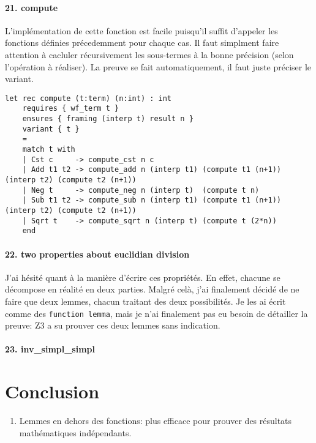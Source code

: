 \documentclass[a4paper]{article}%
\begin{document}
	\paragraph{21. compute} L'implémentation de cette fonction est facile puisqu'il suffit d'appeler les fonctions
	définies précedemment pour chaque cas. Il faut simplment faire attention à cacluler récursivement les sous-termes
	à la bonne précision (selon l'opération à réaliser). La preuve se fait automatiquement, il faut juste préciser le variant.
	\begin{verbatim}
let rec compute (t:term) (n:int) : int
	requires { wf_term t }
	ensures { framing (interp t) result n }
	variant { t }
	=
	match t with
	| Cst c     -> compute_cst n c
	| Add t1 t2 -> compute_add n (interp t1) (compute t1 (n+1)) (interp t2) (compute t2 (n+1))
	| Neg t     -> compute_neg n (interp t)  (compute t n)
	| Sub t1 t2 -> compute_sub n (interp t1) (compute t1 (n+1)) (interp t2) (compute t2 (n+1))
	| Sqrt t    -> compute_sqrt n (interp t) (compute t (2*n))
	end
	\end{verbatim}

	\paragraph{22. two properties about euclidian division } J'ai hésité quant à la manière d'écrire ces propriétés.
	En effet, chacune se décompose en réalité en deux parties. Malgré celà, j'ai finalement décidé de ne faire que deux lemmes,
	chacun traitant des deux possibilités. Je les ai écrit comme des \texttt{function lemma}, mais je n'ai finalement
	pas eu besoin de détailler la preuve: Z3 a su prouver ces deux lemmes sans indication.

	\paragraph{23. inv\_simpl\_simpl}

	\section{Conclusion}
		
	\begin{enumerate}
		\item Lemmes en dehors des fonctions: plus efficace pour prouver des résultats mathématiques indépendants.
	\end{enumerate}
\end{document}
